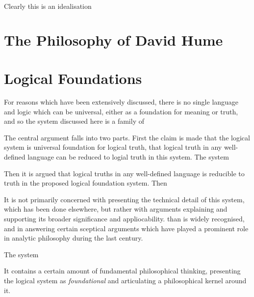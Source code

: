 Clearly this is an idealisation

\section{The Philosophy of David Hume}

\section{Logical Foundations}

For reasons which have been extensively discussed, there is no single language and logic which can be universal, either as a foundation for meaning or truth, and so the system discussed here is a family of  

The central argument falls into two parts.
First the claim is made that the logical system is universal foundation for logical truth, that logical truth in any well-defined language can be reduced to logial truth in this system.
The system

Then it is argued that logical truths in any well-defined language is reducible to truth in the proposed logical foundation system.
Then 


It is not primarily concerned with presenting the technical detail of this system, which has been done elsewhere, but rather with arguments explaining and supporting its broader significance and appliocability.
than is widely recognised, and in answering certain sceptical arguments which have played a prominent role in analytic philosophy during the last century.

The system 

It contains a certain amount of fundamental philosophical thinking, presenting the logical system as \emph{foundational} and articulating a philosophical kernel around it.
